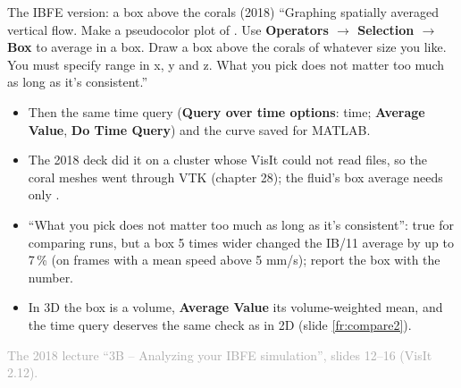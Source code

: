 \documentclass[aspectratio=169,11pt]{beamer}
\newcommand{\sourcecredit}[1]{\vfill\begin{flushright}\tiny\textcolor{DarkGray}{#1}\end{flushright}}
\newcommand{\gui}[1]{\textsf{\textbf{#1}}}
\begin{document}
\begin{frame}{The IBFE version: a box above the corals (2018)}
\label{fr:ibfe}
\footnotesize
``Graphing spatially averaged vertical flow. Make a pseudocolor plot of . Use \gui{Operators $\to$ Selection $\to$ Box} to average in a box. Draw a box above the corals of whatever size you like. You must specify range in x, y and z. What you pick does not matter too much as long as it's consistent.''
\begin{itemize}
  \item Then the same time query (\gui{Query over time options}: time; \gui{Average Value}, \gui{Do Time Query}) and the curve saved for MATLAB.
  \item The 2018 deck did it on a cluster whose VisIt could not read  files, so the coral meshes went through VTK (chapter 28); the fluid's box average needs only .
  \item ``What you pick does not matter too much as long as it's consistent'': true for comparing runs, but a box 5 times wider changed the IB/11 average by up to 7\,\% (on frames with a mean speed above 5 mm/s); report the box with the number.
  \item In 3D the box is a volume, \gui{Average Value} its volume-weighted mean, and the time query deserves the same check as in 2D (slide \ref{fr:compare2}).
\end{itemize}
\sourcecredit{The 2018 lecture ``3B -- Analyzing your IBFE simulation'', slides 12--16 (VisIt 2.12).}
\end{frame}
\end{document}
